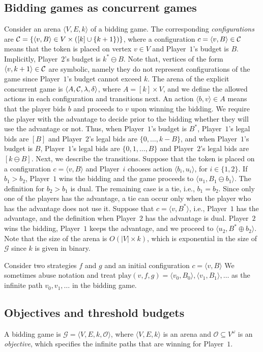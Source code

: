 \documentclass{theoretics}
\newcommand{\PO}{Player~$1$\xspace}
\newcommand{\PT}{Player~$2$\xspace}
\newcommand{\PLi}{Player~$i$\xspace}
\newcommand{\C}{{\cal C}}
\newcommand{\G}{{\mathcal G}}
\newcommand{\play}{\text{play}\xspace}
\newcommand{\zug}[1]{\langle #1  \rangle}
\renewcommand{\set}[1]{\{ #1  \}}
\newcommand{\Obj}{\mathcal{O}}
\begin{document}
\subsection{Bidding games as concurrent games}
\label{sec:bidding2conc}
Consider an arena $\zug{V, E, k}$ of a bidding game. 
The corresponding {\em configurations} are $\C = \set{\zug{v, B} \in V \times ([k] \cup \{k+1\})}$, where a configuration $c = \zug{v, B} \in \C$ means that the token is placed on vertex \(v \in V\) and \PO's budget is \(B\). Implicitly, \PT's budget is \(k^* \ominus B\). 
Note that, vertices of the form \(\zug{v, k+1} \in \C\) are symbolic, namely they do not represent configurations of the game since \PO's budget cannot exceed $k$. 
The arena of the explicit concurrent game is $\zug{A, \C, \lambda, \delta}$, where $A = [k] \times V$, and we define the allowed actions in each configuration and transitions next. 
An action \(\zug{b, v} \in A\) means that the player bids \(b\) and proceeds to \(v\) upon winning the bidding. 
We require the player with the advantage to decide prior to the bidding whether they will use the advantage or not. 
Thus, when \PO's budget is $B^*$, \PO's legal bids are $[B]$ and \PT's legal bids are $\set{0,\ldots, k- B}$, and when \PO's budget is $B$, \PO's legal bids are $\set{0,1,\ldots, B}$ and \PT's legal bids are $[k \ominus B]$.
Next, we describe the transitions.
Suppose that the token is placed on a configuration $c = \zug{v, B}$ and \PLi chooses action $\zug{b_i, u_i}$, for $i \in \set{1,2}$. If $b_1 > b_2$, \PO wins the bidding and the game proceeds to $\zug{u_1, B_1 \ominus b_1}$. The definition for $b_2 > b_1$ is dual. 
The remaining case is a tie, i.e., $b_1 = b_2$. Since only one of the players has the advantage, a tie can occur only when the player who has the advantage does not use it. Suppose that $c = \zug{v, B^*}$, i.e., \PO has the advantage, and the definition when \PT has the advantage is dual. 
\PT wins the bidding, \PO keeps the advantage, and we proceed to $\zug{u_2, B^* \oplus b_2}$. 
Note that the size of the arena is $O(|V|  \times k)$, which is exponential in the size of $\G$ since $k$ is given in binary.

Consider two strategies $f$ and $g$ and an initial configuration $c = \zug{v, B}$
We sometimes abuse notation and treat $\play(v, f, g) = \zug{v_0, B_0}, \zug{v_1, B_1},\ldots$ as the infinite path $v_0,v_1,\ldots$ in the bidding game.




\subsection{Objectives and threshold budgets}
\label{sec:prelim-obj}
A bidding game is $\G = \zug{V, E, k, \Obj}$, where $\zug{V, E, k}$ is an arena and $\Obj \subseteq V^\omega$ is an {\em objective}, which specifies the infinite paths that are winning for \PO. 
\end{document}
